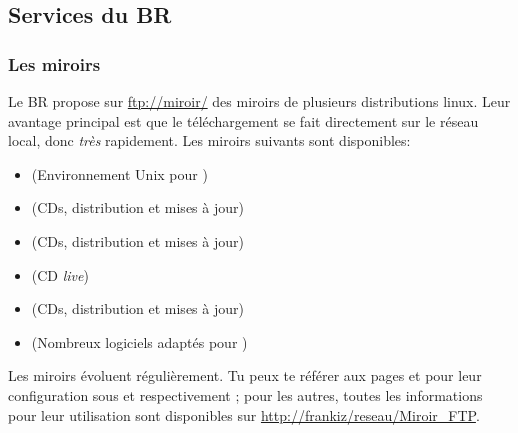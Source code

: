 \subsection{Services du BR}


\subsubsection{Les miroirs}
Le BR propose sur \url{ftp://miroir/} des miroirs de plusieurs distributions linux. Leur avantage principal est que le téléchargement se fait directement sur le réseau local, donc \emph{très} rapidement.
Les miroirs suivants sont disponibles:

\begin{itemize}
\item {} (Environnement Unix pour )
\item {} (CDs, distribution et mises à jour)
\item {} (CDs, distribution et mises à jour)
\item {} (CD \emph{live})
\item {} (CDs, distribution et mises à jour)
\item {} (Nombreux logiciels  adaptés pour )
\end{itemize}


Les miroirs évoluent régulièrement. Tu peux te référer aux pages \pageref{gentoo_mirror} et \pageref{ubuntu_mirror} pour leur configuration sous  et  respectivement ; pour les autres, toutes les informations pour leur utilisation sont disponibles sur \url{http://frankiz/reseau/Miroir\_FTP}.
